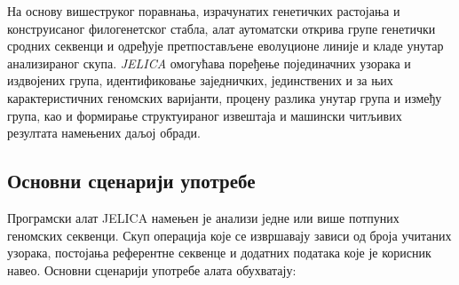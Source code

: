 \documentclass[12pt,oneside]{memoir}
\begin{document}
На основу вишеструког поравнања, израчунатих генетичких растојања и конструисаног филогенетског стабла, алат аутоматски открива групе генетички сродних секвенци и одређује претпостављене еволуционе линије и кладе унутар анализираног скупа. \textit{JELICA} омогућава поређење појединачних узорака и издвојених група, идентификовање заједничких, јединствених и за њих карактеристичних геномских варијанти, процену разлика унутар група и између група, као и формирање структуираног извештаја и машински читљивих резултата намењених даљој обради.

\subsection{Основни сценарији употребе}
Програмски алат JELICA намењен је анализи једне или више потпуних геномских секвенци. Скуп операција које се извршавају зависи од броја учитаних узорака, постојања референтне секвенце и додатних података које је корисник навео. Основни сценарији употребе алата обухватају:
\end{document}
